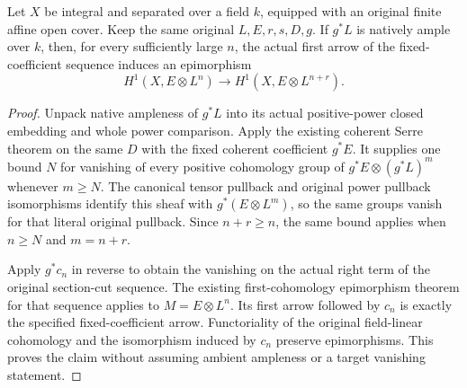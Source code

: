 \begin{lemma}
\label{lem:seshadri-fixed-coefficient-cut-eventual-hone-epi}
\leanok
{}
Let $X$ be integral and separated over a field $k$, equipped with an
original finite affine open cover. Keep the same original $L,E,r,s,D,g$.
If $g^*L$ is natively ample over $k$, then, for every sufficiently large
$n$, the actual first arrow of the fixed-coefficient sequence induces
an epimorphism
\[
 H^1(X,E\otimes L^n)\longrightarrow H^1(X,E\otimes L^{n+r}).
\]
\end{lemma}
\begin{proof}
Unpack native ampleness of $g^*L$ into its actual positive-power closed
embedding and whole power comparison. Apply the existing coherent Serre
theorem on the same $D$ with the fixed coherent coefficient $g^*E$.
It supplies one bound $N$ for vanishing of every positive cohomology
group of $g^*E\otimes(g^*L)^m$ whenever $m\geq N$.
The canonical tensor pullback and original power pullback isomorphisms
identify this sheaf with $g^*(E\otimes L^m)$, so the same groups vanish
for that literal original pullback. Since $n+r\geq n$, the same bound
applies when $n\geq N$ and $m=n+r$.

Apply $g^*c_n$ in reverse to obtain the vanishing on the actual right
term of the original section-cut sequence. The existing first-cohomology
epimorphism theorem for that sequence applies to $M=E\otimes L^n$.
Its first arrow followed by $c_n$ is exactly the specified
fixed-coefficient arrow. Functoriality of the original field-linear
cohomology and the isomorphism induced by $c_n$ preserve epimorphisms.
This proves the claim without assuming ambient ampleness or a target
vanishing statement.
\end{proof}

